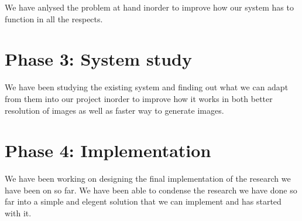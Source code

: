 We have anlysed the problem at hand inorder to improve how our system has to function in all the respects.

\section{Phase 3: System study}

We have been studying the existing system and finding out what we can adapt from them into our project inorder to improve how it works in both better resolution of images as well as faster way to generate images.

\section{Phase 4: Implementation}

We have been working on designing the final implementation of the research we have been on so far. We have been able to condense the research we have done so far into a simple and elegent solution that we can implement and has started with it.
